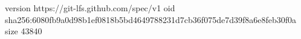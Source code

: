 version https://git-lfs.github.com/spec/v1
oid sha256:6080fb9a0d98b1ef0818b5bd4649788231d7cb36f075de7d39f8a6e8feb30f0a
size 43840
